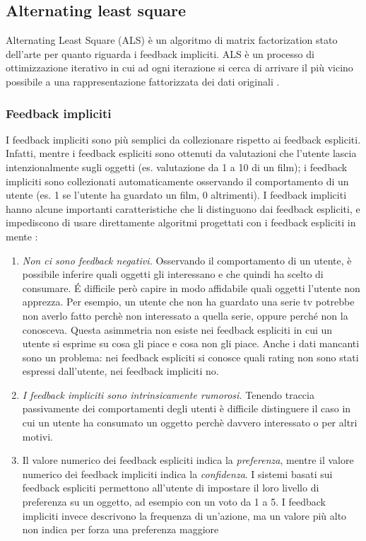 \documentclass[12pt,italian]{report}
\begin{document}
\subsection{Alternating least square} \label{subsec:als}
Alternating Least Square (ALS) \cite{als} è un algoritmo di matrix factorization stato dell'arte per quanto riguarda i feedback impliciti. ALS è un processo di ottimizzazione iterativo in cui ad ogni iterazione si cerca di arrivare il più vicino possibile a una rappresentazione fattorizzata dei dati originali \cite{als-medium}. 

\subsubsection{Feedback impliciti}
I feedback impliciti sono più semplici da collezionare rispetto ai feedback espliciti. Infatti, mentre i feedback espliciti sono ottenuti da valutazioni che l'utente lascia intenzionalmente sugli oggetti (es. valutazione da 1 a 10 di un film); i feedback impliciti sono collezionati automaticamente osservando il comportamento di un utente (es. 1 se l'utente ha guardato un film, 0 altrimenti).
I feedback impliciti hanno alcune importanti caratteristiche che li distinguono dai feedback espliciti, e impediscono di usare direttamente algoritmi progettati con i feedback espliciti in mente \cite{als}:
\begin{enumerate}
 \item \textit{Non ci sono feedback negativi.} Osservando il comportamento di un utente, è possibile inferire quali oggetti gli interessano e che quindi ha scelto di consumare. \'E difficile però capire in modo affidabile quali oggetti l'utente non apprezza. Per esempio, un utente che non ha guardato una serie tv potrebbe non averlo fatto perchè non interessato a quella serie, oppure perché non la conosceva. Questa asimmetria non esiste nei feedback espliciti in cui un utente si esprime su cosa gli piace e cosa non gli piace. Anche i dati mancanti sono un problema: nei feedback espliciti si conosce quali rating non sono stati espressi dall'utente, nei feedback impliciti no.
 
 \item \textit{I feedback impliciti sono intrinsicamente rumorosi.} Tenendo traccia passivamente dei comportamenti degli utenti è difficile distinguere il caso in cui un utente ha consumato un oggetto perchè davvero interessato o per altri motivi.
 
 \item Il valore numerico dei feedback espliciti indica la \textit{preferenza}, mentre il valore numerico dei feedback impliciti indica la \textit{confidenza}. I sistemi basati sui feedback espliciti permettono all'utente di impostare il loro livello di preferenza su un oggetto, ad esempio con un voto da 1 a 5. I feedback impliciti invece descrivono la frequenza di un'azione, ma un valore più alto  non indica per forza una preferenza maggiore
\end{enumerate}
\end{document}
